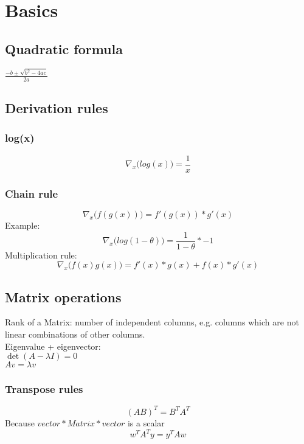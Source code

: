 \section{Basics}
\subsection{Quadratic formula}
$\frac{-b \pm \sqrt{b^{2}-4ac}}{2a}$
\subsection{Derivation rules}
\subsubsection{log(x)}
\begin{equation}
	\nabla_{x}\big( log(x) \big) = \frac{1}{x}
\end{equation}
\subsubsection{Chain rule}
\begin{equation}
	\nabla_{x}\big( f(g(x)) \big) = f'(g(x))*g'(x)
\end{equation}
Example:
\begin{equation}
	\nabla_{x}\big( log(1-\theta) \big) = \frac{1}{1-\theta}*- 1
\end{equation}
Multiplication rule:
\begin{equation}
	\nabla_{x}\big( f(x)g(x) \big) = f'(x)*g(x) + f(x)*g'(x)
\end{equation}
\subsection{Matrix operations}
Rank of a Matrix: number of independent columns, e.g. columns which are not linear
combinations of other columns.\\ Eigenvalue + eigenvector:\\ $\det(A-\lambda I)=0$\\
$Av=\lambda v$
\subsubsection{Transpose rules}
\begin{equation}
	(AB)^{T}= B^{T}A^{T}
\end{equation}
Because $vector * Matrix * vector$ is a scalar
\begin{equation}
	w^{T}A^{T}y = y^{T}Aw
\end{equation}
